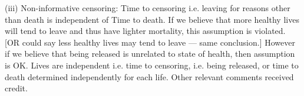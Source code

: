 \documentclass[a4paper,12pt]{article}
\begin{document}

\newpage

(iii)
Non-informative censoring: Time to censoring i.e. leaving for reasons
other than death is independent of Time to death.
If we believe that more healthy lives will tend to leave and thus
have lighter mortality, this assumption is violated. [OR could say
less healthy lives may tend to leave — same conclusion.]
However if we believe that being released is unrelated to state of
health, then assumption is OK.
Lives are independent i.e. time to censoring, i.e. being released, or time to
death determined independently for each life.
Other relevant comments received credit.
\end{document}
